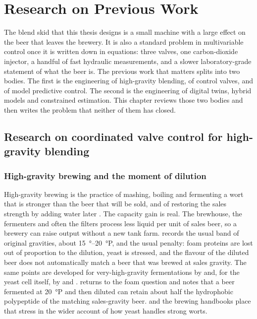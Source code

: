 \chapter{Research on Previous Work}
\label{ch:previous}

The blend skid that this thesis designs is a small machine with a large effect on the beer that leaves the brewery. It is also a standard problem in multivariable control once it is written down in equations: three valves, one carbon-dioxide injector, a handful of fast hydraulic measurements, and a slower laboratory-grade statement of what the beer is. The previous work that matters splits into two bodies. The first is the engineering of high-gravity blending, of control valves, and of model predictive control. The second is the engineering of digital twins, hybrid models and constrained estimation. This chapter reviews those two bodies and then writes the problem that neither of them has closed.

\section{Research on coordinated valve control for high-gravity blending}
\label{sec:tech1lit}

\subsection{High-gravity brewing and the moment of dilution}

High-gravity brewing is the practice of mashing, boiling and fermenting a wort that is stronger than the beer that will be sold, and of restoring the sales strength by adding water later \citep{stewart2010,kunze2019}. The capacity gain is real. The brewhouse, the fermenters and often the filters process less liquid per unit of sales beer, so a brewery can raise output without a new tank farm. \citet{stewart2010} records the usual band of original gravities, about \SIrange{15}{20}{\degree}P, and the usual penalty: foam proteins are lost out of proportion to the dilution, yeast is stressed, and the flavour of the diluted beer does not automatically match a beer that was brewed at sales gravity. The same points are developed for very-high-gravity fermentations by \citet{puligundla2011} and, for the yeast cell itself, by \citet{gibson2007} and \citet{casey1984}. \citet{stewart2013} returns to the foam question and notes that a beer fermented at \SI{20}{\degree}P and then diluted can retain about half the hydrophobic polypeptide of the matching sales-gravity beer. \citet{boulton2001} and the brewing handbooks \citep{briggs2004,priest2006} place that stress in the wider account of how yeast handles strong worts.


